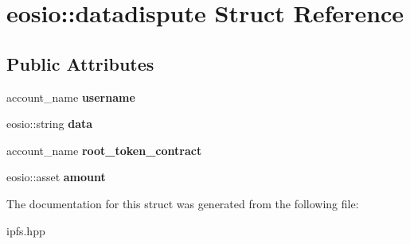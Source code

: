 \hypertarget{structeosio_1_1datadispute}{}\section{eosio\+:\+:datadispute Struct Reference}
\label{structeosio_1_1datadispute}
\subsection*{Public Attributes}
\begin{DoxyCompactItemize}
\item 
\mbox{\label{structeosio_1_1datadispute_a2d731976007a9ec48b472aefdf438ccd}} 
account\+\_\+name {\bfseries username}
\item 
\mbox{\label{structeosio_1_1datadispute_ad44cce31dce9f0a4222abf81b9742199}} 
eosio\+::string {\bfseries data}
\item 
\mbox{\label{structeosio_1_1datadispute_ac1bfda597c02b14854e1bfdeab560ded}} 
account\+\_\+name {\bfseries root\+\_\+token\+\_\+contract}
\item 
\mbox{\label{structeosio_1_1datadispute_ab8b72d328704b92331fb0347dc427a37}} 
eosio\+::asset {\bfseries amount}
\end{DoxyCompactItemize}


The documentation for this struct was generated from the following file\+:\begin{DoxyCompactItemize}
\item 
ipfs.\+hpp\end{DoxyCompactItemize}
